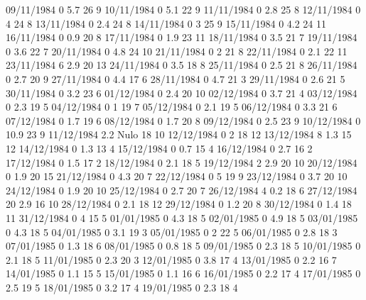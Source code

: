 09/11/1984  0      5.7    26     9 
10/11/1984  0      5.1    22     9 
11/11/1984  0      2.8    25     8 
12/11/1984  0      4      24     8 
13/11/1984  0      2.4    24     8 
14/11/1984  0      3      25     9 
15/11/1984  0      4.2    24     11 
16/11/1984  0      0.9    20     8 
17/11/1984  0      1.9    23     11 
18/11/1984  0      3.5    21     7 
19/11/1984  0      3.6    22     7 
20/11/1984  0      4.8    24     10 
21/11/1984  0      2      21     8 
22/11/1984  0      2.1    22     11 
23/11/1984  6      2.9    20     13 
24/11/1984  0      3.5    18     8 
25/11/1984  0      2.5    21     8 
26/11/1984  0      2.7    20     9 
27/11/1984  0      4.4    17     6 
28/11/1984  0      4.7    21     3 
29/11/1984  0      2.6    21     5 
30/11/1984  0      3.2    23     6 
01/12/1984  0      2.4    20     10 
02/12/1984  0      3.7    21     4 
03/12/1984  0      2.3    19     5 
04/12/1984  0      1      19     7 
05/12/1984  0      2.1    19     5 
06/12/1984  0      3.3    21     6 
07/12/1984  0      1.7    19     6 
08/12/1984  0      1.7    20     8 
09/12/1984  0      2.5    23     9 
10/12/1984  0      10.9   23     9 
11/12/1984  2.2   Nulo    18     10 
12/12/1984  0      2      18     12 
13/12/1984  8      1.3    15     12 
14/12/1984  0      1.3    13     4 
15/12/1984  0      0.7    15     4 
16/12/1984  0      2.7    16     2 
17/12/1984  0      1.5    17     2 
18/12/1984  0      2.1    18     5 
19/12/1984  2      2.9    20     10 
20/12/1984  0      1.9    20     15 
21/12/1984  0      4.3    20     7 
22/12/1984  0      5      19     9 
23/12/1984  0      3.7    20     10 
24/12/1984  0      1.9    20     10 
25/12/1984  0      2.7    20     7 
26/12/1984  4      0.2    18     6 
27/12/1984  20     2.9    16     10 
28/12/1984  0      2.1    18     12 
29/12/1984  0      1.2    20     8 
30/12/1984  0      1.4    18     11 
31/12/1984  0      4      15     5 
01/01/1985  0      4.3    18     5 
02/01/1985  0      4.9    18     5 
03/01/1985  0      4.3    18     5 
04/01/1985  0      3.1    19     3 
05/01/1985  0      2      22     5 
06/01/1985  0      2.8    18     3 
07/01/1985  0      1.3    18     6 
08/01/1985  0      0.8    18     5 
09/01/1985  0      2.3    18     5 
10/01/1985  0      2.1    18     5 
11/01/1985  0      2.3    20     3 
12/01/1985  0      3.8    17     4 
13/01/1985  0      2.2    16     7 
14/01/1985  0      1.1    15     5 
15/01/1985  0      1.1    16     6 
16/01/1985  0      2.2    17     4 
17/01/1985  0      2.5    19     5 
18/01/1985  0      3.2    17     4 
19/01/1985  0      2.3    18     4 
